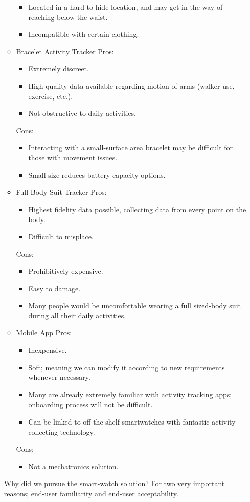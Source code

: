 \documentclass[12pt, titlepage]{article}
\begin{document}
\begin{enumerate}
\begin{itemize}
\begin{itemize}
		\item Located in a hard-to-hide location, and may get in the way of reaching below the waist.
		\item Incompatible with certain clothing.
	\end{itemize}
\item Bracelet Activity Tracker
	Pros:
	\begin{itemize}
		\item Extremely discreet.
		\item High-quality data available regarding motion of arms (walker use, exercise, etc.).
		\item Not obstructive to daily activities.
	\end{itemize}
	Cons:
	\begin{itemize}
		\item Interacting with a small-surface area bracelet may be difficult for those with movement issues.
		\item Small size reduces battery capacity options.
	\end{itemize}
\item Full Body Suit Tracker
	Pros:
	\begin{itemize}
		\item Highest fidelity data possible, collecting data from every point on the body.
		\item Difficult to misplace.
	\end{itemize}
	Cons:
	\begin{itemize}
		\item Prohibitively expensive.
		\item Easy to damage.
		\item Many people would be uncomfortable wearing a full sized-body suit during all their daily activities.
	\end{itemize}
\item Mobile App 
	Pros:
	\begin{itemize}
		\item Inexpensive.
		\item Soft; meaning we can modify it according to new requirements whenever necessary.
		\item Many are already extremely familiar with activity tracking apps; onboarding process will not be difficult.
		\item Can be linked to off-the-shelf smartwatches with fantastic activity collecting technology.
	\end{itemize}
	Cons:
	\begin{itemize}
		\item Not a mechatronics solution.
	\end{itemize}
\end{itemize}
Why did we pursue the smart-watch solution? For two very important reasons; end-user familiarity and end-user acceptability.\\


\end{enumerate}
\end{document}
